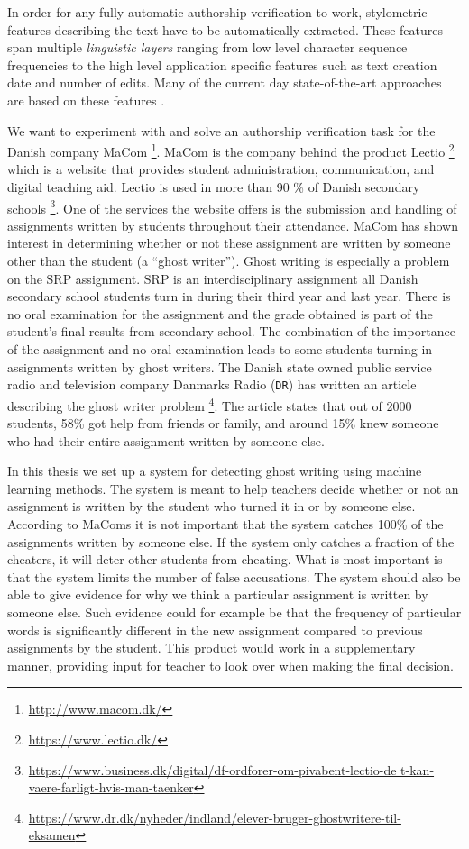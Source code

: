 In order for any fully automatic authorship verification to work, stylometric
features describing the text have to be automatically extracted. These features
span multiple \textit{linguistic layers} ranging from low level character
sequence frequencies to the high level application specific features such as
text creation date and number of edits. Many of the current day state-of-the-art
approaches are based on these features \citep{stamatos2009}.


We want to experiment with and solve an authorship verification task for the
Danish company MaCom \footnote{\url{http://www.macom.dk/}}. MaCom is the company
behind the product Lectio \footnote{\url{https://www.lectio.dk/}} which is
a website that provides student administration, communication, and digital
teaching aid. Lectio is used in more than 90 \% of Danish secondary schools
\footnote{\url{https://www.business.dk/digital/df-ordforer-om-pivabent-lectio-de
t-kan-vaere-farligt-hvis-man-taenker}}. One of the services the website
offers is the submission and handling of assignments written by students
throughout their attendance. MaCom has shown interest in determining
whether or not these assignment are written by someone other than the
student (a ``ghost writer''). Ghost writing is especially a problem on
the \gls{SRP} assignment. \gls{SRP} is an interdisciplinary assignment
all Danish secondary school students turn in during their third year and
last year. There is no oral examination for the assignment and the grade
obtained is part of the student's final results from secondary school. The
combination of the importance of the assignment and no oral examination
leads to some students turning in assignments written by ghost writers. The
Danish state owned public service radio and television company Danmarks Radio
(\texttt{DR}) has written an article describing the ghost writer problem
\footnote{\url{https://www.dr.dk/nyheder/indland/elever-bruger-ghostwritere-til-
eksamen}}. The article states that out of 2000 students, 58\% got help from
friends or family, and around 15\% knew someone who had their entire assignment
written by someone else. 

In this thesis we set up a system for detecting ghost writing using machine
learning methods. The system is meant to help teachers decide whether or not
an assignment is written by the student who turned it in or by someone else.
According to MaComs it is not important that the system catches 100\% of the
assignments written by someone else. If the system only catches a fraction of
the cheaters, it will deter other students from cheating. What is most important
is that the system limits the number of false accusations. The system should
also be able to give evidence for why we think a particular assignment is
written by someone else. Such evidence could for example be that the frequency
of particular words is significantly different in the new assignment compared to
previous assignments by the student. This product would work in a supplementary
manner, providing input for teacher to look over when making the final decision.

